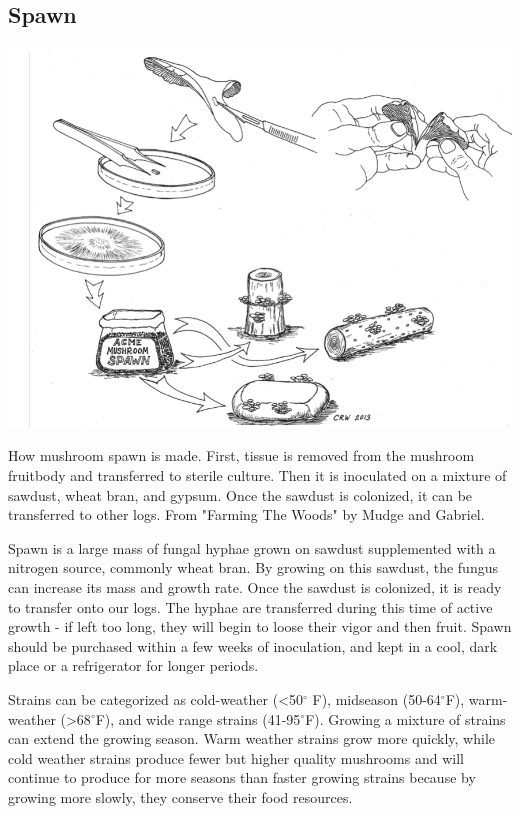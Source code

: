 \documentclass{tufte-handout}
\begin{document}
\subsection{Spawn}

\begin{marginfigure}
\includegraphics{figures/shiitake-spawn}
\caption{How mushroom spawn is made. First, tissue is removed from the mushroom fruitbody and transferred to  sterile culture. Then it is inoculated on a mixture of sawdust, wheat bran, and gypsum. Once the sawdust is colonized, it can be transferred to other logs. From "Farming The Woods" by Mudge and Gabriel.}
\end{marginfigure}

Spawn is a large mass of fungal hyphae grown on sawdust supplemented with a nitrogen source, commonly wheat bran. 
By growing on this sawdust, the fungus can increase its mass and growth rate. Once the sawdust is colonized, it is ready to transfer onto our logs.
The hyphae are transferred during this time of active growth  - if left too long, they will begin to loose their vigor and then fruit. 
Spawn should be purchased within a few weeks of inoculation, and kept in a cool, dark place or a refrigerator for longer periods. 

Strains can be categorized as cold-weather (<50$^{\circ}$ F), midseason (50-64$^{\circ}$F), warm-weather (>68$^{\circ}$F), and wide range strains (41-95$^{\circ}$F). 
Growing a mixture of strains can extend the growing season. 
Warm weather strains grow more quickly, while cold weather strains produce fewer but higher quality mushrooms and will continue to produce for more seasons than faster growing strains because by growing more slowly, they conserve their food resources.
\end{document}
